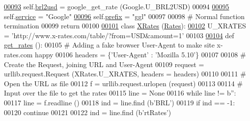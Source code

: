 \begin{DoxyCode}
{{{{\hypertarget{rates_8py_source.tex_l00093}{}\hyperlink{classrates_1_1_google_a0979ffcb18b8bf3156cc5735c67ca6df}{00093}         self.\hyperlink{classrates_1_1_google_a0979ffcb18b8bf3156cc5735c67ca6df}{brl2usd} = google\_get\_rate (Google.U\_BRL2USD)
00094                 
\hypertarget{rates_8py_source.tex_l00095}{}\hyperlink{classrates_1_1_google_a1da08e36d5007aa5293d048b625a35e9}{00095}         self.\hyperlink{classrates_1_1_google_a1da08e36d5007aa5293d048b625a35e9}{service} = \textcolor{stringliteral}{"Google"}
\hypertarget{rates_8py_source.tex_l00096}{}\hyperlink{classrates_1_1_google_ada5de8700ad571d0ab819fa0163d6bbe}{00096}         self.\hyperlink{classrates_1_1_google_ada5de8700ad571d0ab819fa0163d6bbe}{prefix} = \textcolor{stringliteral}{"ggl"}
00097                 
00098         \textcolor{comment}{# Normal function termination}
00099         \textcolor{keywordflow}{return}
00100             
\hypertarget{rates_8py_source.tex_l00101}{}\hyperlink{classrates_1_1_x_rates}{00101} \textcolor{keyword}{class }\hyperlink{classrates_1_1_x_rates}{XRates} (\hyperlink{classrates_1_1_rates}{Rates}):
\hypertarget{rates_8py_source.tex_l00102}{}\hyperlink{classrates_1_1_x_rates_ab3bd64c08e6503f0d76c9f73dc38fa25}{00102}     U\_XRATES = \textcolor{stringliteral}{'http://www.x-rates.com/table/?from=USD&amount=1'}
00103 
\hypertarget{rates_8py_source.tex_l00104}{}\hyperlink{classrates_1_1_x_rates_a034e274f1bf0a2509af2621eb27c7cce}{00104}     \textcolor{keyword}{def }\hyperlink{classrates_1_1_x_rates_a034e274f1bf0a2509af2621eb27c7cce}{get\_rates} ():        
00105         \textcolor{comment}{# Adding a fake browser User-Agent to make site x-rates.com happy}
00106         headers = \{\textcolor{stringliteral}{'User-Agent'} : \textcolor{stringliteral}{'Mozilla 5.10'}\}
00107             
00108         \textcolor{comment}{# Create the Request, joining URL and User-Agent}
00109         request = urllib.request.Request (XRates.U\_XRATES, headers = headers)
00110     
00111         \textcolor{comment}{# Open the URL as file}
00112         f = urllib.request.urlopen (request)
00113         
00114         \textcolor{comment}{# Input over the file to get the rates}
00115         line = \textcolor{keywordtype}{None}
00116         \textcolor{keywordflow}{while} line != b\textcolor{stringliteral}{''}:
00117             line = f.readline ()
00118             ind = line.find (b\textcolor{stringliteral}{'BRL'})
00119             \textcolor{keywordflow}{if} ind == -1:
00120                 \textcolor{keywordflow}{continue} 
00121             
00122             ind = line.find (b\textcolor{stringliteral}{'rtRates'})
}}}}
\end{DoxyCode}
